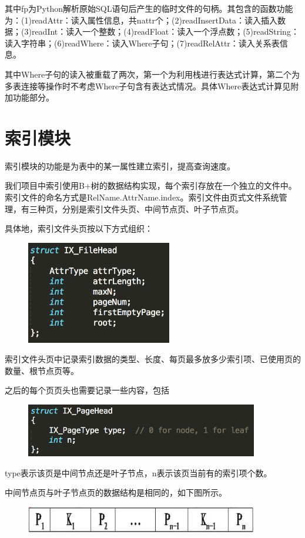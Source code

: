 其中fp为Python解析原始SQL语句后产生的临时文件的句柄。其包含的函数功能为：(1)readAttr：读入属性信息，共nattr个；(2)readInsertData：读入插入数据；(3)readInt：读入一个整数；(4)readFloat：读入一个浮点数；(5)readString：读入字符串；(6)readWhere：读入Where子句；(7)readRelAttr：读入关系表信息。

其中Where子句的读入被重载了两次，第一个为利用栈进行表达式计算，第二个为多表连接等操作时不考虑Where子句含有表达式情况。具体Where表达式计算见附加功能部分。


\section{索引模块}
索引模块的功能是为表中的某一属性建立索引，提高查询速度。

我们项目中索引使用B+树的数据结构实现，每个索引存放在一个独立的文件中。索引文件的命名方式是RelName.AttrName.index。索引文件由页式文件系统管理，有三种页，分别是索引文件头页、中间节点页、叶子节点页。

具体地，索引文件头页按以下方式组织：
\begin{figure}[H]
\centering
\includegraphics[width=2.5in]{Figures/IX_FileHead.png}
\end{figure}

 索引文件头页中记录索引数据的类型、长度、每页最多放多少索引项、已使用页的数量、根节点页等。

 之后的每个页页头也需要记录一些内容，包括
 \begin{figure}[H]
\centering
\includegraphics[width=4in]{Figures/IX_PageHead.png}
\end{figure}

type表示该页是中间节点还是叶子节点，n表示该页当前有的索引项个数。

中间节点页与叶子节点页的数据结构是相同的，如下图所示。
\begin{figure}[H]
\centering
\includegraphics[width=4in]{Figures/indexstruct.png}
\end{figure}

